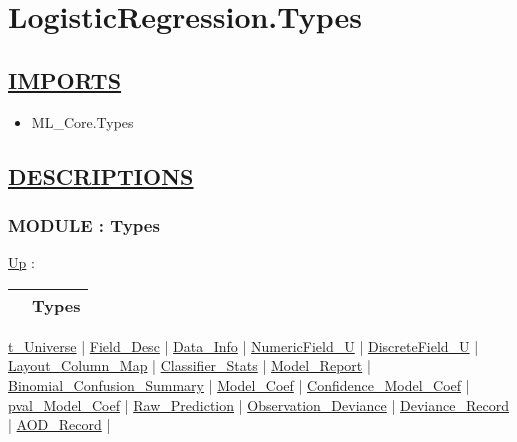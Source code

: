\chapter*{LogisticRegression.Types}
\hypertarget{ecldoc:toc:LogisticRegression.Types}{}

\section*{\underline{IMPORTS}}
\begin{itemize}
\item ML\_Core.Types
\end{itemize}

\section*{\underline{DESCRIPTIONS}}
\subsection*{MODULE : Types}
\hypertarget{ecldoc:LogisticRegression.Types}{}
\hyperlink{ecldoc:toc:LogisticRegression}{Up} :

{\renewcommand{\arraystretch}{1.5}
\begin{tabularx}{\textwidth}{|>{\raggedright\arraybackslash}l|X|}
\hline
\hspace{0pt} & Types \\
\hline
\end{tabularx}
}

\par


\hyperlink{ecldoc:logisticregression.types.t_universe}{t\_Universe}  |
\hyperlink{ecldoc:logisticregression.types.field_desc}{Field\_Desc}  |
\hyperlink{ecldoc:logisticregression.types.data_info}{Data\_Info}  |
\hyperlink{ecldoc:logisticregression.types.numericfield_u}{NumericField\_U}  |
\hyperlink{ecldoc:logisticregression.types.discretefield_u}{DiscreteField\_U}  |
\hyperlink{ecldoc:logisticregression.types.layout_column_map}{Layout\_Column\_Map}  |
\hyperlink{ecldoc:logisticregression.types.classifier_stats}{Classifier\_Stats}  |
\hyperlink{ecldoc:logisticregression.types.model_report}{Model\_Report}  |
\hyperlink{ecldoc:logisticregression.types.binomial_confusion_summary}{Binomial\_Confusion\_Summary}  |
\hyperlink{ecldoc:logisticregression.types.model_coef}{Model\_Coef}  |
\hyperlink{ecldoc:logisticregression.types.confidence_model_coef}{Confidence\_Model\_Coef}  |
\hyperlink{ecldoc:logisticregression.types.pval_model_coef}{pval\_Model\_Coef}  |
\hyperlink{ecldoc:logisticregression.types.raw_prediction}{Raw\_Prediction}  |
\hyperlink{ecldoc:logisticregression.types.observation_deviance}{Observation\_Deviance}  |
\hyperlink{ecldoc:logisticregression.types.deviance_record}{Deviance\_Record}  |
\hyperlink{ecldoc:logisticregression.types.aod_record}{AOD\_Record}  |

